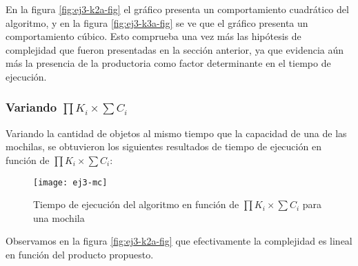En la figura \ref{fig:ej3-k2a-fig} el gráfico presenta un comportamiento cuadrático del algoritmo, y en la figura \ref{fig:ej3-k3a-fig} se ve que el gráfico presenta un comportamiento cúbico. Esto comprueba una vez más las hipótesis de complejidad que fueron presentadas en la sección anterior, ya que evidencia aún más la presencia de la productoria como factor determinante en el tiempo de ejecución.

\subsubsection{Variando $\prod K_i \times \sum C_i$}

Variando la cantidad de objetos al mismo tiempo que la capacidad de una de las mochilas, se obtuvieron los siguientes resultados de tiempo de ejecución en función de $\prod K_i \times \sum C_i$:

\begin{figure}[H]
		\centering
		\texttt{[image: ej3-mc]}
		\caption{Tiempo de ejecución del algoritmo en función de $\prod K_i \times \sum C_i$ para una mochila}
		\label{fig:ej3-mc-fig}
	\end{figure}

Observamos en la figura \ref{fig:ej3-k2a-fig} que efectivamente la complejidad es lineal en función del producto propuesto.

